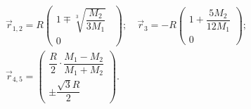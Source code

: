 \begin{equation}
	\begin{gathered}
		\vec{r}_{1,2} = R \begin{pmatrix}
		1 \mp \sqrt[3]{\dfrac{M_2}{3M_1}}~~\\[1pc]
		0
	\end{pmatrix}; \quad
	\vec{r}_3 = - R \begin{pmatrix}
	1 + \dfrac{ 5 M_2}{12 M_1}\\[1pc]
	0
\end{pmatrix};\\[0.5pc]
\vec{r}_{4,5} = \begin{pmatrix}
\dfrac{R}{2} \cdot \dfrac{M_1-M_2}{M_1+M_2}\\[1pc]
\pm \dfrac{\sqrt{3}R}{2}
\end{pmatrix}.
\end{gathered}
\end{equation}


